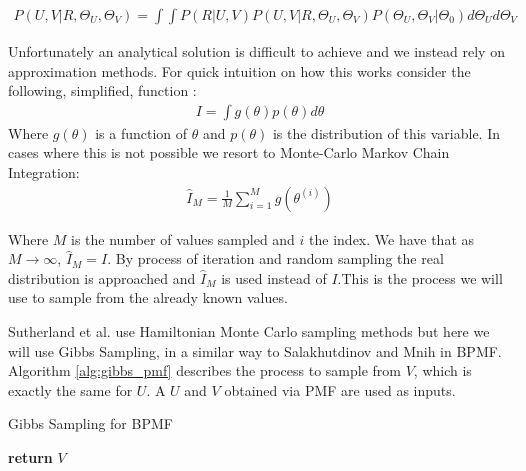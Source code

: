 \begin{align*}
P(U,V|R,\Theta_U,\Theta_V) =\int \int P(R | U,V) P(U,V | R,\Theta_U,\Theta_V) P(\Theta_U,\Theta_V | \Theta_0)d\Theta_U d\Theta_V
\end{align*}

Unfortunately an analytical solution is difficult to achieve and we instead rely on approximation methods. For quick intuition on how this works consider the following, simplified, function \cite{mcmc-int}:
\begin{align*}
I = \int g(\theta)p(\theta)d\theta
\end{align*}
Where $g(\theta)$ is a function of $\theta$ and $p(\theta)$ is the distribution of this variable. In cases where this is not possible we resort to Monte-Carlo Markov Chain Integration:
\begin{align*}
\hat{I}_M =\frac{1}{M} \sum\limits_{i=1}^{M} g(\theta ^{(i)}) 
\end{align*}

Where $M$ is the number of values sampled and $i$ the index. We have that as $M \to \infty$, $\hat{I}_M = I$. By process of iteration and random sampling the real distribution is approached and $\hat{I}_M$ is used instead of $I$.This is the process we will use to sample from the already known values.


 Sutherland et al.\cite{active-mf} use Hamiltonian Monte Carlo sampling methods but here we will use Gibbs Sampling, in a similar way to Salakhutdinov and Mnih \cite{SalMnih2008} in BPMF. Algorithm \ref{alg:gibbs_pmf} describes the process to sample from $V$, which is exactly the same for $U$. A $U$ and $V$ obtained via PMF are used as inputs.


\begin{algorithm}
\caption{Gibbs Sampling for BPMF}\label{alg:gibbs_pmf}
\begin{algorithmic}[1]
 
 
 
 
 
 
 
\EndFor
\State \textbf{return} $V$
\EndProcedure
\end{algorithmic}
\end{algorithm}


